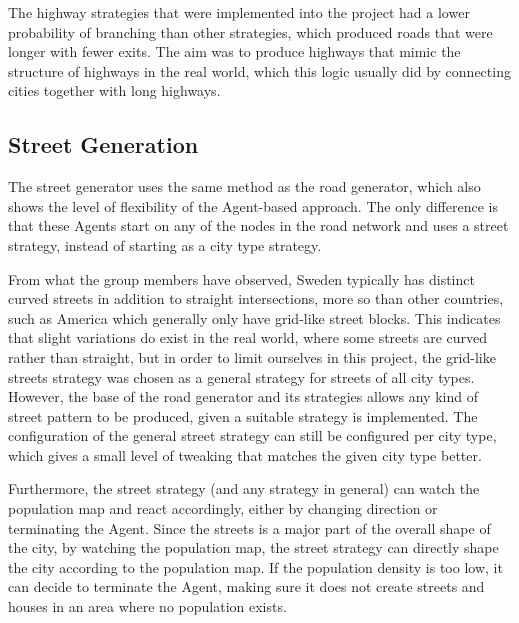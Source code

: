 The highway strategies that were implemented into the project had a lower probability of branching than other strategies, which produced roads that were longer with fewer exits.
The aim was to produce highways that mimic the structure of highways in the real world, which this logic usually did by connecting cities together with long highways.

\subsection{Street Generation}
The street generator uses the same method as the road generator, which also shows the level of flexibility of the Agent-based approach.
The only difference is that these Agents start on any of the nodes in the road network and uses a street strategy, instead of starting as a city type strategy.

From what the group members have observed, Sweden typically has distinct curved streets in addition to straight intersections, more so than other countries, such as America which generally only have grid-like street blocks.
This indicates that slight variations do exist in the real world, where some streets are curved rather than straight, but in order to limit ourselves in this project, the grid-like streets strategy was chosen as a general strategy for streets of all city types.
However, the base of the road generator and its strategies allows any kind of street pattern to be produced, given a suitable strategy is implemented.
The configuration of the general street strategy can still be configured per city type, which gives a small level of tweaking that matches the given city type better.

Furthermore, the street strategy (and any strategy in general) can watch the population map and react accordingly, either by changing direction or terminating the Agent.
Since the streets is a major part of the overall shape of the city, by watching the population map, the street strategy can directly shape the city according to the population map.
If the population density is too low, it can decide to terminate the Agent, making sure it does not create streets and houses in an area where no population exists.

